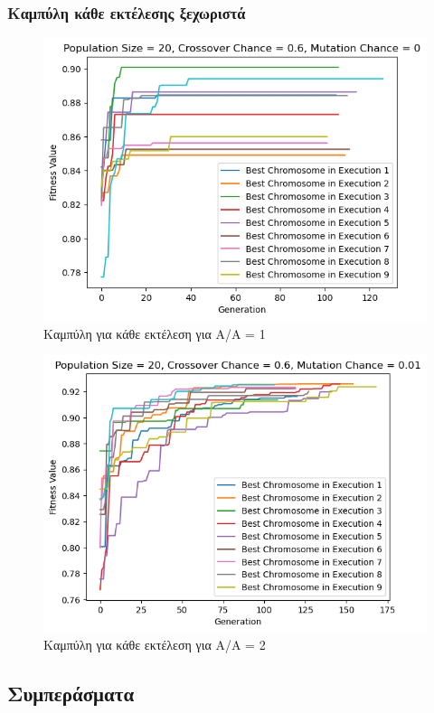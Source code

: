 \documentclass[12pt,a4paper]{article}
\begin{document}
\subsubsection{Καμπύλη κάθε εκτέλεσης ξεχωριστά}
\begin{figure}[H]
	\includegraphics[width=\textwidth]{Screenshots/2. All for AA = 1.png}
	\caption{Καμπύλη για κάθε εκτέλεση για A/A = 1}
\end{figure}

\begin{figure}[H]
	\includegraphics[width=\textwidth]{Screenshots/4. All for AA = 2.png}
	\caption{Καμπύλη για κάθε εκτέλεση για A/A = 2}
\end{figure}

\subsection{Συμπεράσματα}
\end{document}

